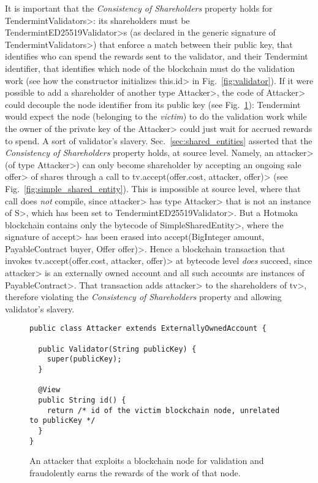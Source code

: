 It is important that the \emph{Consistency of Shareholders} property holds
for \<TendermintValidators>: its shareholders
must be \<TendermintED25519Validator>s (as declared in the generic
signature of \<TendermintValidators>) that enforce a
match between their public key, that identifies who can spend the rewards sent to the validator,
and their Tendermint identifier, that identifies which node of the blockchain
must do the validation work (see how the constructor initializes \<this.id> in
Fig.~\ref{fig:validator}).
If it were possible to add a shareholder of another
type \<Attacker>, the code of \<Attacker> could decouple the node identifier from its
public key (see Fig.~\ref{fig:attacker}):
Tendermint would expect the node (belonging to the \emph{victim}) to do
the validation work while the owner
of the private key of the \<Attacker> could just wait for accrued rewards to spend.
A sort of validator's slavery.
Sec.~\ref{sec:shared_entities} asserted that the \emph{Consistency of Shareholders}
property holds, at source level.
Namely, an \<attacker> (of type \<Attacker>) can only become shareholder
by accepting an ongoing sale \<offer> of shares through a call to
\<tv.accept(offer.cost, attacker, offer)> (see Fig.~\ref{fig:simple_shared_entity}).
This is impossible at source level, where that call does \emph{not} compile, since \<attacker> has type \<Attacker> that
is not an instance of \<S>, which has been set to \<TendermintED25519Validator>.
But a Hotmoka blockchain contains only the bytecode of \<SimpleSharedEntity>,
where the signature of \<accept> has been erased into
\<accept(BigInteger amount, PayableContract buyer, Offer offer)>.
Hence a blockchain transaction that invokes \<tv.accept(offer.cost, attacker, offer)>
at bytecode level
\emph{does} succeed, since \<attacker> is an externally owned account and all such accounts
are instances of \<PayableContract>.
That transaction adds \<attacker> to the shareholders of \<tv>,
therefore violating the \emph{Consistency of Shareholders} property and allowing
validator's slavery.

\begin{figure}[t]
  \begin{center}
    \begin{lstlisting}[language=Takamaka]
public class Attacker extends ExternallyOwnedAccount {

  public Validator(String publicKey) {
    super(publicKey);
  }

  @View
  public String id() {
    return /* id of the victim blockchain node, unrelated to publicKey */
  }
}
    \end{lstlisting}
  \end{center}
  \caption{An attacker that exploits a blockchain node for validation and fraudolently earns the rewards of the work of that node.}\label{fig:attacker}
\end{figure}

